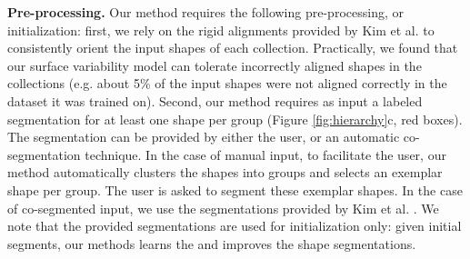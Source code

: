 \textbf{Pre-processing.} Our method requires the following pre-processing, or initialization: first, we rely on the rigid alignments provided by Kim et al.  to consistently orient the input shapes of each collection. Practically, we found that our surface variability model can tolerate incorrectly aligned shapes in the collections (e.g. about 5\% of the input shapes were not aligned correctly in the dataset it was trained on). Second, our method requires as input a labeled segmentation for at least one shape per group (Figure \ref{fig:hierarchy}c, red boxes). The segmentation can be provided by either the user, or an automatic co-segmentation technique. In the case of manual input, to facilitate the user, our method automatically clusters the shapes into groups and selects an exemplar shape per group. The user is asked to segment these exemplar shapes. In the case of co-segmented input, we use the segmentations provided by Kim et al. . We note that the provided segmentations are used for initialization only: given initial segments, our methods learns the  and improves the shape segmentations. 

